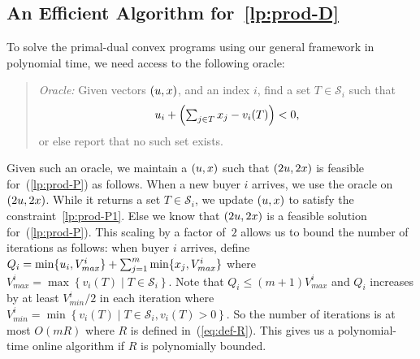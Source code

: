\documentclass[letterpaper,11pt]{article}
\def\cS{\mathcal{S}}
\begin{document}
\subsection{An Efficient Algorithm for~\eqref{lp:prod-D}}

To solve the primal-dual convex programs using our general framework in
polynomial time, we need access to the following oracle:
\begin{quote}
  \emph{Oracle:} Given vectors $(u, x)$, and an index $i$, find a
  set $T\in \cS_i$ such that
  \begin{gather}
    \textstyle u_i + \left(\sum_{j\in T} x_j -
      v_i(T)\right) < 0, \label{eq:sep-oracle-prod}
  \end{gather}
 or else report that no such set exists.
\end{quote}
Given such an oracle, we maintain a $(u,x)$ such that $(2u, 2x)$ is
feasible for~(\ref{lp:prod-P}) as follows. When a new buyer $i$ arrives,
we use the oracle on $(2u, 2x)$. While it returns a set $T \in \cS_i$,
we update $(u, x)$ to satisfy the constraint~\eqref{lp:prod-P1}. Else
we know that $(2u, 2x)$ is a feasible solution for~(\ref{lp:prod-P}).
This scaling by a factor of~$2$ allows us to bound the number of
iterations as follows: when buyer $i$ arrives, define $Q_i =
\min\{u_i, V^i_{max}\}+ \sum_{j=1}^m \min\{x_j, V^i_{max}\}$ where
$V^i_{max}=\max \left\{ v_i(T) \mid T\in \cS_i\right\}$. Note that
$Q_i\le (m+1)V^i_{max}$ and $Q_i$ increases by at least $V^i_{min}/2$ in each
iteration where $V^i_{min}=\min \left\{v_i(T) \mid T\in \cS_i,
  v_i(T)>0\right\}$. So the number of iterations is at most $O(mR)$
where $R$ is defined in~(\ref{eq:def-R}). This gives us a
polynomial-time online algorithm if $R$ is polynomially bounded.
\end{document}
